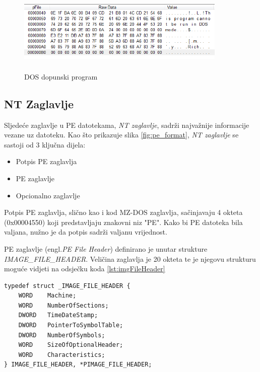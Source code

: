 \documentclass[times, utf8, diplomski, numeric]{fer}
\begin{document}
\begin{figure}[!ht]
\centering
\setlength\fboxsep{0pt}
\setlength\fboxrule{0.5pt}
\includegraphics[width=10cm, height=4cm]{slike/dos_stub}
\caption{DOS dopunski program}
\label{fig:dos_stub} 
\end{figure}

\subsection{NT Zaglavlje}

Sljedeće zaglavlje u PE datotekama, \emph{NT zaglavlje}, sadrži
najvažnije informacije vezane uz datoteku. Kao što prikazuje
slika \ref{fig:pe_format}, \emph{NT zaglavlje} se sastoji od 3
ključna dijela:

\begin{itemize}
\item Potpis PE zaglavlja
\item PE zaglavlje
\item Opcionalno zaglavlje
\end{itemize} 

Potpis PE zaglavlja, slično kao i kod MZ-DOS zaglavlja,
sačinjavaju 4 okteta (0x00004550) koji predstavljaju znakovni niz
"PE". Kako bi PE datoteka bila valjana, nužno je da potpis
sadrži valjanu vrijednost. 

PE zaglavlje (engl.\emph{PE File Header}) definirano je unutar
strukture \emph{IMAGE\_FILE\_HEADER}. Veličina zaglavlja je 20
	okteta te je njegovu strukturu moguće vidjeti na odsječku koda				%
\ref{lst:imgFileHeader}

\begin{lstlisting}[frame=single, caption=IMAGE\_FILE\_HEADER struktura, label={lst:imgFileHeader}]
typedef struct _IMAGE_FILE_HEADER {
	WORD    Machine;
	WORD    NumberOfSections;
	DWORD   TimeDateStamp;
	DWORD   PointerToSymbolTable;
	DWORD   NumberOfSymbols;
	WORD    SizeOfOptionalHeader;
	WORD    Characteristics;
} IMAGE_FILE_HEADER, *PIMAGE_FILE_HEADER;
\end{lstlisting}
\end{document}
